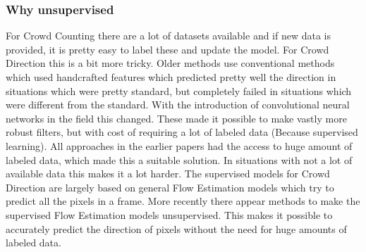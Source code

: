 \subsubsection{Why unsupervised}
For Crowd Counting there are a lot of datasets available and if new data is provided, it is pretty easy to label these and update the model. For Crowd Direction this is a bit more tricky. Older methods use conventional methods which used handcrafted features which predicted pretty well the direction in situations which were pretty standard, but completely failed in situations which were different from the standard. With the introduction of convolutional neural networks in the field this changed. These made it possible to make vastly more robust filters, but with cost of requiring a lot of labeled data (Because supervised learning). All approaches in the earlier papers had the access to huge amount of labeled data, which made this a suitable solution. In situations with not a lot of available data this makes it a lot harder.
The supervised models for Crowd Direction are largely based on general Flow Estimation models which try to predict all the pixels in a frame. More recently there appear methods to make the supervised Flow Estimation models unsupervised. This makes it possible to accurately predict the direction of pixels without the need for huge amounts of labeled data.
